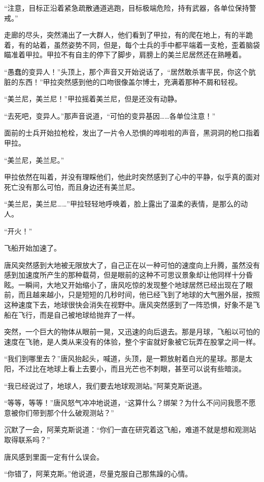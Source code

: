 “注意，目标正沿着紧急疏散通道逃跑，目标极端危险，持有武器，各单位保持警戒。”

走廊的尽头，突然涌出了一大群人，他们看到了甲拉，有的爬在地上，有的半跪着，有的站着，虽然姿势不同，但是，每个士兵的手中都平端着一支枪，歪着脑袋瞄准着甲拉。甲拉不有自主的停下了脚步，肩膀上的美兰尼居然还在熟睡着。

“愚蠢的变异人！”头顶上，那个声音又开始说话了，“居然敢杀害平民，你这个肮脏的东西！”甲拉突然感到他的口吻很像盖尔博士，充满着那种不屑和轻视。

“美兰尼，美兰尼！”甲拉摇着美兰尼，但是还没有动静。

“去死吧，变异人。”那声音说道，“可怕的变异基因……各单位注意！”

面前的士兵开始拉枪栓，发出了一片令人恐惧的哗啦啦的声音，黑洞洞的枪口指着甲拉。

“美兰尼，美兰尼。”

甲拉依然在叫着，并没有理睬他们，他此时突然感到了心中的平静，似乎真的面对死亡没有那么可怕，而且身边还有美兰尼。

“美兰尼，美兰尼……”甲拉轻轻地呼唤着，脸上露出了温柔的表情，是那么的动人。

“开火！”

飞船开始加速了。

唐风突然感到大地被无限放大了，自己正在以一种可怕的速度向上升腾，虽然没有感到加速度所产生的那种载荷，但是眼前的这种不可思议景象却让他同样十分昏眩。一瞬间，大地又开始缩小了，唐风吃惊的发现整个地球居然已经出现在了眼前，而且越来越小，只是短短的几秒时间，他已经飞到了地球的大气圈外层，按照这种速度下去，地球很快会消失在视野中。唐风突然感到了一阵恐惧，好象不是飞船在飞行，而是自己被地球给抛弃了一样。

突然，一个巨大的物体从眼前一晃，又迅速的向后退去。那是月球，飞船以可怕的速度在飞驰，是人类从来没有的体验，整个宇宙就好象被它玩弄在股掌之间一样。

“我们到哪里去？”唐风抬起头，喊道，头顶，是一颗放射着白光的星球。那是太阳，不过比在地球上看上去要小，而且光芒也不刺眼，甚至可以说有些暗淡。

“我已经说过了，地球人，我们要去地球观测站。”阿莱克斯说道。

“等等，等等！”唐风怒气冲冲地说道，“这算什么？绑架？为什么不问问我愿不愿意被你们带到那个什么破观测站？”

沉默了一会，阿莱克斯说道：“你们一直在研究着这飞船，难道不就是想和观测站取得联系吗？”

唐风感到里面一定有什么误会。

“你错了，阿莱克斯。”他说道，尽量克服自己那焦躁的心情。


